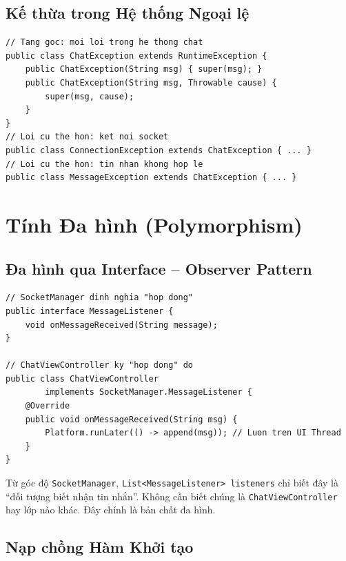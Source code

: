 \documentclass[12pt, a4paper, oneside]{report}
\newcommand{\code}[1]{\texttt{\color{hustblue!80!black}#1}}
\begin{document}
\subsection{Kế thừa trong Hệ thống Ngoại lệ}

\begin{lstlisting}[caption={Phân cấp ngoại lệ theo ngữ nghĩa},
                   label=lst:exc, style=javastyle]
// Tang goc: moi loi trong he thong chat
public class ChatException extends RuntimeException {
    public ChatException(String msg) { super(msg); }
    public ChatException(String msg, Throwable cause) {
        super(msg, cause);
    }
}
// Loi cu the hon: ket noi socket
public class ConnectionException extends ChatException { ... }
// Loi cu the hon: tin nhan khong hop le
public class MessageException extends ChatException { ... }
\end{lstlisting}

\section{Tính Đa hình (Polymorphism)}

\subsection{Đa hình qua Interface -- Observer Pattern}

\begin{lstlisting}[caption={Observer Pattern: MessageListener interface},
                   label=lst:observer, style=javastyle]
// SocketManager dinh nghia "hop dong"
public interface MessageListener {
    void onMessageReceived(String message);
}

// ChatViewController ky "hop dong" do
public class ChatViewController
        implements SocketManager.MessageListener {
    @Override
    public void onMessageReceived(String msg) {
        Platform.runLater(() -> append(msg)); // Luon tren UI Thread
    }
}
\end{lstlisting}

Từ góc độ \code{SocketManager}, \code{List<MessageListener> listeners} chỉ
biết đây là ``đối tượng biết nhận tin nhắn''. Không cần biết chúng là
\code{ChatViewController} hay lớp nào khác. Đây chính là bản chất đa hình.

\subsection{Nạp chồng Hàm Khởi tạo}
\end{document}
